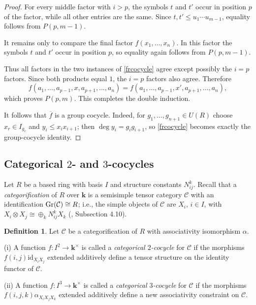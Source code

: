 \documentclass[12pt]{amsart}
\numberwithin{equation}{section}
\theoremstyle{definition}
\newtheorem{definition}[theorem]{Definition}
\newcommand{\id}{\text{id}}
\newcommand{\1}{_{(1)}}
\newcommand{\2}{_{(2)}}
\newcommand{\3}{_{(3)}}
\newcommand{\4}{_{(4)}}
\newcommand{\5}{_{(5)}}
\newcommand{\6}{_{(6)}}
\newcommand{\C}{\mathcal{C}}
\theoremstyle{plain}
\theoremstyle{definition}
\theoremstyle{remark}
\def\C{\mathcal{C}}
\def\k{\mathbf{k}}
\begin{document}
\begin{proof}
For every middle factor with $i>p$, the symbols $t$ and $t'$ occur in position $p$ of the factor, while all other entries are the same.  Since
$t,t'\le u_1\cdots u_{m-1}$, equality follows from $P(p,m-1)$.

It remains only to compare the final factor $f(x_1,\ldots,x_n)$.
In this factor the symbols $t$ and $t'$ occur in position $p$, so equality again follows from $P(p,m-1)$.

Thus all factors in the two instances of \eqref{frcocycle} agree except possibly the $i=p$ factors.  Since both products equal $1$, the $i=p$ factors also agree.  Therefore
\begin{equation*}
        f(a_1,\ldots,a_{p-1},x,a_{p+1},\ldots,a_n)
        =
        f(a_1,\ldots,a_{p-1},x',a_{p+1},\ldots,a_n),
\end{equation*}
which proves $P(p,m)$.  This completes the double induction.

It follows that $\overline f$ is a group cocycle. Indeed, for $g_1,\ldots,g_{n+1}\in U(R)$ choose $x_r\in I_{g_r}$ and $y_i\le x_i x_{i+1}$; then $\deg y_i=g_i g_{i+1}$, so \eqref{frcocycle} becomes exactly the group-cocycle identity. 
\end{proof} 

\subsection{Categorical $2$- and $3$-cocycles} 

Let $R$ be a based ring with basis $I$ and structure constants $N_{ij}^k$. Recall that a {\it categorification} of $R$ over $\k$ is a semisimple tensor category $\C$ with an identification ${\rm Gr}(\C)\cong R$; i.e., the simple objects of $\C$ are $X_i$, $i\in I$, with $X_i\otimes X_j\cong \oplus_k N_{ij}^k X_k$ (\cite{EGNO}, Subsection 4.10).  

\begin{definition} Let $\C$ be a categorification of $R$ with associativity isomorphism $\alpha$. 

(i) A function $f:I^2\to \k^\times$ is called a {\it categorical $2$-cocycle} for $\C$ if the morphisms
$f(i,j)\id_{X_iX_j}$ extended additively define a tensor structure on the identity functor of $\C$.

(ii) A function $f:I^3\to \k^\times$ is called a {\it categorical $3$-cocycle} for $\C$ if the morphisms
$f(i,j,k)\alpha_{X_iX_jX_k}$ extended additively define a new associativity constraint on $\C$. 
\end{definition} 
\end{document}
